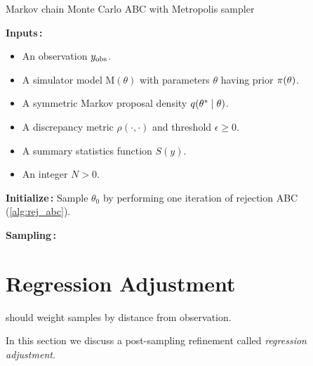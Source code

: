\begin{algorithm}[!htb]
\caption{Markov chain Monte Carlo ABC with Metropolis sampler}
\label{alg:mcmcabc}
\SetAlgoLined
\DontPrintSemicolon
 \textbf{Inputs\,:}\;
 \vspace{-5mm}
 \begin{itemize}
    \item An observation $y_\mathrm{obs}$. 
     \item A simulator model $\mathrm{M}(\theta)$ with parameters $\theta$ having prior $\pi \qty(\theta)$.
     \item A symmetric Markov proposal density $q \qty(\theta^* \mid \theta)$.
     \item A discrepancy metric $\rho(\cdot, \cdot)$ and threshold $\epsilon \geq 0$. 
     \item A summary statistics function $S(y)$. 
     \item An integer $N>0$.
 \end{itemize}
 
 \vspace{5mm}
 \textbf{Initialize\,:}\;
 \nl Sample $\theta_0$ by performing one iteration of rejection ABC (\cref{alg:rej_abc}).\;

 \vspace{5mm}
 \textbf{Sampling\,:}\;
\end{algorithm}

\section{Regression Adjustment}

should weight samples by distance from observation. 

In this section we discuss a post-sampling refinement called \textit{regression adjustment}. 


